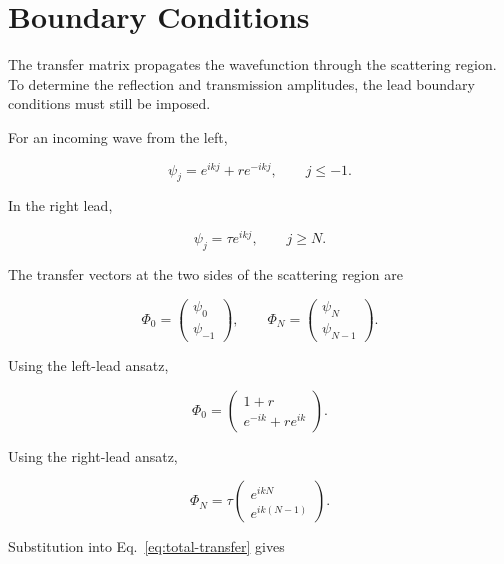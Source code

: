 \section{Boundary Conditions}

The transfer matrix propagates the wavefunction through the scattering
region. To determine the reflection and transmission amplitudes, the
lead boundary conditions must still be imposed.

For an incoming wave from the left,

\begin{equation}
	\psi_j
	=
	e^{ikj}
	+
	r e^{-ikj},
	\qquad
	j\leq -1.
	\label{eq:left-transfer}
\end{equation}

In the right lead,

\begin{equation}
	\psi_j
	=
	\tau e^{ikj},
	\qquad
	j\geq N.
	\label{eq:right-transfer}
\end{equation}

The transfer vectors at the two sides of the scattering region are

\begin{equation}
	\Phi_0
	=
	\begin{pmatrix}
		\psi_0 \\
		\psi_{-1}
	\end{pmatrix},
	\qquad
	\Phi_N
	=
	\begin{pmatrix}
		\psi_N \\
		\psi_{N-1}
	\end{pmatrix}.
\end{equation}

Using the left-lead ansatz,

\begin{equation}
	\Phi_0
	=
	\begin{pmatrix}
		1+r \\
		e^{-ik}+r e^{ik}
	\end{pmatrix}.
	\label{eq:left-vector}
\end{equation}

Using the right-lead ansatz,

\begin{equation}
	\Phi_N
	=
	\tau
	\begin{pmatrix}
		e^{ikN} \\
		e^{ik(N-1)}
	\end{pmatrix}.
	\label{eq:right-vector}
\end{equation}

Substitution into Eq.~\eqref{eq:total-transfer} gives

